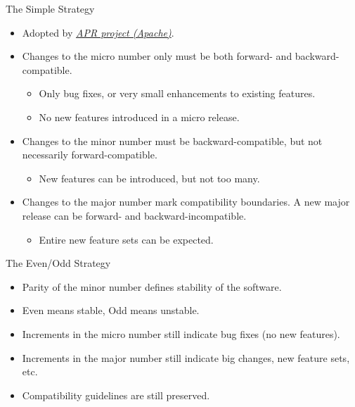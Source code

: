 \documentclass{beamer}
\begin{document}
\begin{frame}{The Simple Strategy}
\begin{itemize}
	\item Adopted by \emph{\href{http://apr.apache.org/versioning.html}{APR project (Apache)}}. 
	\item Changes to the micro number only must be both forward- and backward-compatible. 
	\begin{itemize}
		\item Only bug fixes, or very small enhancements to existing features.
		\item No new features introduced in a micro release.
	\end{itemize}
	\item Changes to the minor number must be backward-compatible, but not necessarily forward-compatible. 
	\begin{itemize}
		\item New features can be introduced, but not too many.
	\end{itemize}
	\item Changes to the major number mark compatibility boundaries. A new major release can be forward- and backward-incompatible. 
	\begin{itemize}
		\item Entire new feature sets can be expected.
	\end{itemize}
\end{itemize}
\end{frame}

\begin{frame}{The Even/Odd Strategy}
\begin{itemize}
	\item Parity of the minor number defines stability of the software. 
	\item Even means stable, Odd means unstable. 
	\item Increments in the micro number still indicate bug fixes (no new features).  
	\item Increments in the major number still indicate big changes, new feature sets, etc. 
	\item Compatibility guidelines are still preserved.
\end{itemize}
\end{frame}
\end{document}
